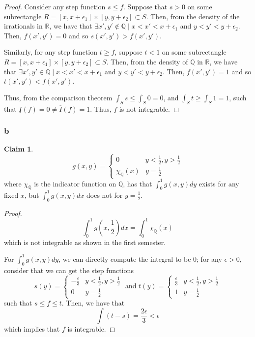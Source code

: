 \documentclass[12pt,letterpaper]{article}
\theoremstyle{definition}
\newtheorem*{claim}{Claim}
\newcommand{\R}{\mathbb{R}}
\newcommand{\Q}{\mathbb{Q}}
\begin{document}
\begin{proof}
  Consider any step function $s \leq f$. Suppose that $s > 0$ on some
  subrectangle $R = [x,x + \epsilon_1] \times [y,y + \epsilon_2] \subset S$.
  Then, from the density of the irrationals in $\R$, we have that $\exists x', y'
  \notin \Q \mid x < x' < x + \epsilon_1$ and $y < y' < y + \epsilon_2$. Then,
  $f(x',y') = 0$ and so $s(x',y') > f(x',y')$.

  Similarly, for any step function $t \geq f$, suppose $t < 1$ on some
  subrectangle $R = [x,x + \epsilon_1] \times [y,y + \epsilon_2] \subset S$.
  Then, from the density of $\Q$ in $\R$, we have that $\exists x', y'
  \in \Q \mid x < x' < x + \epsilon_1$ and $y < y' < y + \epsilon_2$. Then,
  $f(x',y') = 1$ and so $t(x',y') < f(x',y')$.

  Thus, from the comparison theorem $\int_S s \leq \int_S 0 = 0$, and $\int_S t
  \geq \int_S 1 = 1$, such that $\underline{I}(f) = 0 \neq \overline{I}(f) = 1$.
  Thus, $f$ is not integrable.
\end{proof}

\subsubsection*{b}

\begin{claim}
  \[
    g(x,y) =
    \begin{cases}
      0 & y < \frac{1}{2}, y > \frac{1}{2} \\
      \chi_\Q(x) & y = \frac{1}{2}
    \end{cases}
  \]
  where $\chi_\Q$ is the indicator function on $\Q$,
  has that $\int_0^1g(x,y)dy$ exists for any fixed $x$, but $\int_0^1g(x,y)dx$
  does not for $y = \frac{1}{2}$.
\end{claim}

\begin{proof}
  \[
    \int_0^1g(x,\frac{1}{2})dx = \int_0^1\chi_\Q(x)
  \]
  which is not integrable as shown in the first semester.

  For $\int_0^1g(x,y)dy$, we can directly compute the integral to be 0; for any
  $\epsilon > 0$, consider that we can get the step functions
  \[
    s(y) =
    \begin{cases}
      -\frac{\epsilon}{3} & y < \frac{1}{2}, y > \frac{1}{2} \\
      0 & y = \frac{1}{2}
    \end{cases} \text{ and }
    t(y) =
    \begin{cases}
      \frac{\epsilon}{3} & y < \frac{1}{2}, y > \frac{1}{2} \\
      1 & y = \frac{1}{2}
    \end{cases}
  \]
  such that $s \leq f \leq t$. Then, we have that 
  \[
    \int (t - s) = \frac{2\epsilon}{3} < \epsilon
  \]
  which implies that $f$ is integrable.
\end{proof}
\end{document}
